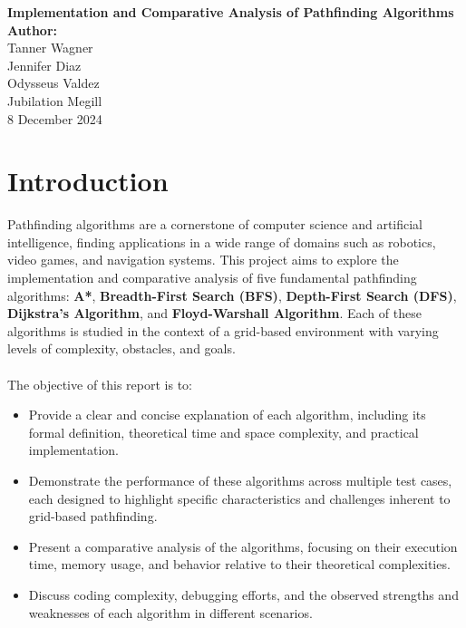 \documentclass[12pt]{article}
\begin{document}
\begin{titlepage}
    \centering
    \vspace*{1in}
    \huge
    \textbf{Implementation and Comparative Analysis of Pathfinding Algorithms}\\[0.5in]
    \Large
    \textbf{Author:}\\[0.2in]
    Tanner Wagner\\
    Jennifer Diaz\\
    Odysseus Valdez\\
    Jubilation Megill\\[1in]
    \normalsize
    8 December 2024
    \vfill
\end{titlepage}

\newpage
\tableofcontents
\newpage

\section{Introduction}
Pathfinding algorithms are a cornerstone of computer science and artificial intelligence, finding applications in a wide range of domains such as robotics, video games, and navigation systems. This project aims to explore the implementation and comparative analysis of five fundamental pathfinding algorithms: \textbf{A*}, \textbf{Breadth-First Search (BFS)}, \textbf{Depth-First Search (DFS)}, \textbf{Dijkstra's Algorithm}, and \textbf{Floyd-Warshall Algorithm}. Each of these algorithms is studied in the context of a grid-based environment with varying levels of complexity, obstacles, and goals.
\\
\\
The objective of this report is to:
\begin{itemize}
    \item Provide a clear and concise explanation of each algorithm, including its formal definition, theoretical time and space complexity, and practical implementation.
    \item Demonstrate the performance of these algorithms across multiple test cases, each designed to highlight specific characteristics and challenges inherent to grid-based pathfinding.
    \item Present a comparative analysis of the algorithms, focusing on their execution time, memory usage, and behavior relative to their theoretical complexities.
    \item Discuss coding complexity, debugging efforts, and the observed strengths and weaknesses of each algorithm in different scenarios.
\end{itemize}
\end{document}
